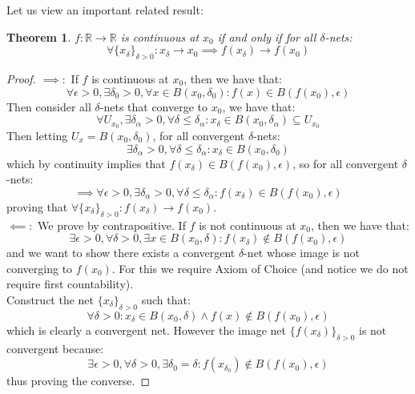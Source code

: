 \documentclass[10pt,letterpaper]{article} %
\newtheorem{thm}{Theorem}[section]
\begin{document}
Let us view an important related result:
\begin{thm}
$f: \mathbb{R} \xrightarrow{} \mathbb{R}$ is continuous at $x_0$ if and only if for all $\delta$-nets:
\begin{equation*}
\forall \{x_\delta\}_{\delta > 0}: x_\delta \xrightarrow{} x_0 \implies f(x_\delta) \xrightarrow{} f(x_0)
\end{equation*}
\end{thm}
\begin{proof}
$\implies:$ If $f$ is continuous at $x_0$, then we have that:
\begin{equation*}
\forall \epsilon > 0, \exists \delta_0 > 0, \forall x \in B(x_0, \delta_0): f(x) \in B(f(x_0), \epsilon)
\end{equation*}
Then consider all $\delta$-nets that converge to $x_0$, we have that:
\begin{equation*}
\forall U_{x_0}, \exists \delta_\alpha > 0, \forall \delta \leqslant \delta_\alpha: x_\delta \in B(x_0, \delta_\alpha) \subseteq U_{x_0}
\end{equation*}
Then letting $U_x = B(x_0, \delta_0)$, for all convergent $\delta$-nets:
\begin{equation*}
\exists \delta_\alpha > 0, \forall \delta \leqslant \delta_\alpha: x_\delta \in B(x_0, \delta_0)
\end{equation*}
which by continuity implies that $f(x_\delta) \in B(f(x_0), \epsilon)$, so for all convergent $\delta$-nets:
\begin{equation*}
\implies \forall \epsilon > 0, \exists \delta_\alpha > 0, \forall \delta \leqslant \delta_\alpha: f(x_\delta) \in B(f(x_0), \epsilon)
\end{equation*}
proving that $\forall \{x_\delta\}_{\delta > 0}: f(x_\delta) \xrightarrow{} f(x_0)$.\\

$\impliedby:$ We prove by contrapositive. If $f$ is not continuous at $x_0$, then we have that:
\begin{equation*}
\exists \epsilon > 0, \forall \delta > 0, \exists x \in B(x_0, \delta): f(x_\delta) \notin B(f(x_0), \epsilon)
\end{equation*}
and we want to show there exists a convergent $\delta$-net whose image is not converging to $f(x_0)$. For this we require Axiom of Choice (and notice we do not require first countability).\\

Construct the net $\{x_\delta\}_{\delta > 0}$ such that:
\begin{equation*}
\forall \delta > 0: x_\delta \in B(x_0, \delta) \land f(x) \notin B(f(x_0), \epsilon)
\end{equation*}
which is clearly a convergent net. However the image net $\{f(x_\delta)\}_{\delta > 0}$ is not convergent because:
\begin{equation*}
\exists \epsilon > 0, \forall \delta > 0, \exists \delta_0 = \delta: f(x_{\delta_0}) \notin B(f(x_0), \epsilon)
\end{equation*}
thus proving the converse. 
\end{proof}
\end{document}
